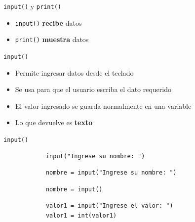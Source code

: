 \documentclass{beamer}
\begin{document}


    \begin{frame}[fragile,t]{\texttt{input()} y \texttt{print()}}
        \begin{itemize}
            \item \texttt{input()} \textbf{recibe} datos
            \item \texttt{print()} \textbf{muestra} datos
        \end{itemize}
    \end{frame}

    
    \begin{frame}[fragile,t]{\texttt{input()}}
        \begin{itemize}
            \item Permite ingresar datos desde el teclado
            \item Se usa para que el usuario escriba el dato requerido
            \item El valor ingresado se guarda normalmente en una variable
            \item Lo que devuelve es \textbf{texto}
        \end{itemize}
    \end{frame}

    \begin{frame}[fragile,t]{\texttt{input()}}
        \begin{verbatim}
            input("Ingrese su nombre: ")
        \end{verbatim}

        \begin{verbatim}
            nombre = input("Ingrese su nombre: ")
        \end{verbatim}

        \begin{verbatim}
            nombre = input()
        \end{verbatim}

        \begin{verbatim}
            valor1 = input("Ingrese el valor: ")
            valor1 = int(valor1)
        \end{verbatim}
    \end{frame}
\end{document}
